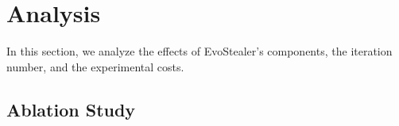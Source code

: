 \section{Analysis}

In this section, we analyze the effects of EvoStealer's components, the iteration number, and the experimental costs.

\subsection{Ablation Study} \label{ablation}


